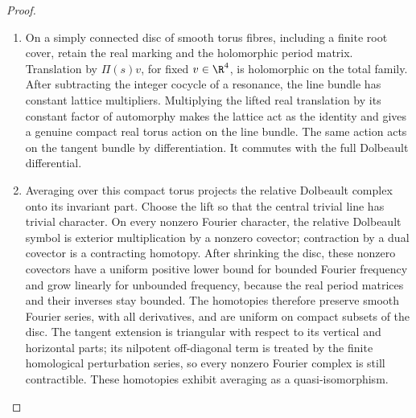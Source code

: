 \begin{proof}
\begin{enumerate}[label=\arabic*.,leftmargin=*]
\item On a simply connected disc of smooth
torus fibres, including a finite root cover, retain the real marking
and the holomorphic period matrix. Translation by $\Pi(s)v$, for
fixed $v\in\R^4$, is holomorphic on the total family. After
subtracting the integer cocycle of a resonance, the line bundle has
constant lattice multipliers. Multiplying the lifted real translation
by its constant factor of automorphy makes the lattice act as the
identity and gives a genuine compact real torus action on the line
bundle. The same action acts on the tangent bundle by differentiation.
It commutes with the full Dolbeault differential.

\item Averaging over this compact torus projects the relative Dolbeault
complex onto its invariant part. Choose the lift so that the central
trivial line has trivial character. On every nonzero Fourier character,
the relative Dolbeault symbol is exterior multiplication by a
nonzero covector; contraction by a dual covector is a contracting
homotopy. After shrinking the disc, these nonzero covectors have a
uniform positive lower bound for bounded Fourier frequency and grow
linearly for unbounded frequency, because the real period matrices
and their inverses stay bounded. The homotopies therefore preserve
smooth Fourier series, with all derivatives, and are uniform on
compact subsets of the disc. The tangent extension is triangular
with respect to its vertical and horizontal parts; its nilpotent
off-diagonal term is treated by the finite homological perturbation
series, so every nonzero Fourier complex is still contractible.
These homotopies exhibit averaging as a quasi-isomorphism.


\end{enumerate}
\end{proof}
